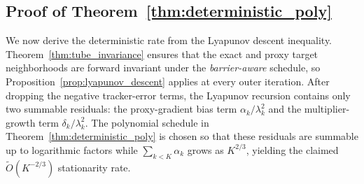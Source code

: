 \documentclass{article}
\begin{document}
\subsection{Proof of Theorem~\ref{thm:deterministic_poly}}

We now derive the deterministic rate from the Lyapunov descent inequality. Theorem~\ref{thm:tube_invariance}
ensures that the exact and proxy target neighborhoods are forward invariant under the \textit{barrier-aware} schedule,
so Proposition~\ref{prop:lyapunov_descent} applies at every outer iteration. After dropping the
negative tracker-error terms, the Lyapunov recursion contains only two summable residuals:
the proxy-gradient bias term \(\alpha_k/\lambda_k^2\) and the multiplier-growth term
\(\delta_k/\lambda_k^2\). The polynomial schedule in Theorem~\ref{thm:deterministic_poly} is chosen
so that these residuals are summable up to logarithmic factors while
\(\sum_{k<K}\alpha_k\) grows as \(K^{2/3}\), yielding the claimed
\(\widetilde O(K^{-2/3})\) stationarity rate.
\end{document}
